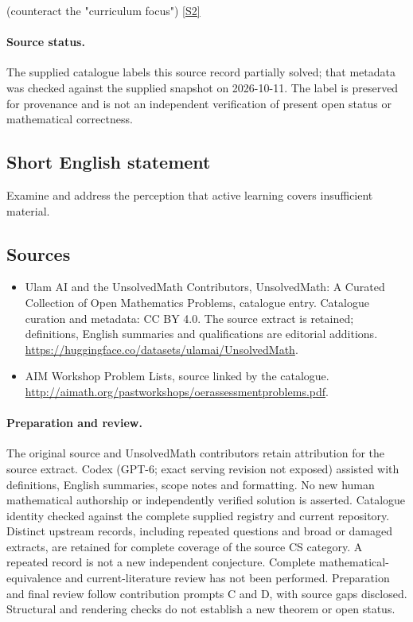 \documentclass[11pt]{article}
\newcommand{\sref}[2]{\hyperlink{source:#1:#2}{[S#2]}}
\begin{document}
(counteract the "curriculum focus") \sref{statement}{2}
\paragraph{Source status.}
The supplied catalogue labels this source record partially solved; that metadata was checked against the supplied snapshot on 2026-10-11. The label is preserved for provenance and is not an independent verification of present open status or mathematical correctness.
\subsection{Short English statement}
Examine and address the perception that active learning covers insufficient material.
\subsection{Sources}
\begin{itemize}
\item[\hypertarget{source:statement:1}{S1}] Ulam AI and the UnsolvedMath Contributors, UnsolvedMath: A Curated Collection of Open Mathematics Problems, catalogue entry. Catalogue curation and metadata: CC BY 4.0. The source extract is retained; definitions, English summaries and qualifications are editorial additions.
\url{https://huggingface.co/datasets/ulamai/UnsolvedMath}.
\item[\hypertarget{source:statement:2}{S2}] AIM Workshop Problem Lists, source linked by the catalogue.
\url{http://aimath.org/pastworkshops/oerassessmentproblems.pdf}.
\end{itemize}
\paragraph{Preparation and review.}
The original source and UnsolvedMath contributors retain attribution for the source extract. Codex (GPT-6; exact serving revision not exposed) assisted with definitions, English summaries, scope notes and formatting. No new human mathematical authorship or independently verified solution is asserted. Catalogue identity checked against the complete supplied registry and current repository. Distinct upstream records, including repeated questions and broad or damaged extracts, are retained for complete coverage of the source CS category. A repeated record is not a new independent conjecture. Complete mathematical-equivalence and current-literature review has not been performed. Preparation and final review follow contribution prompts C and D, with source gaps disclosed. Structural and rendering checks do not establish a new theorem or open status.
\label{end:statement}
\end{document}
